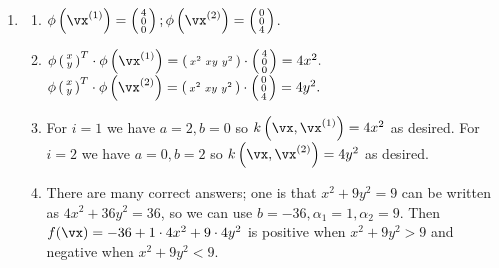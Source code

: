\documentclass{article}
\begin{document}
\begin{enumerate}
\item \label{ML_ex_kerneltrick_solution}
\begin{enumerate}
    \item $\phi\left( \vx^{(1)}\right) = \left( \begin{smallmatrix} 4 \\ 0 \\ 0 \end{smallmatrix} \right);
           \phi\left( \vx^{(2)}\right) = \left( \begin{smallmatrix} 0 \\ 0 \\ 4 \end{smallmatrix} \right)$.
    \item $\phi\left( \begin{smallmatrix} x \\ y         \end{smallmatrix} \right)^T \cdot \phi\left(\vx^{(1)}\right) = 
               \left( \begin{smallmatrix} x^2 & xy & y^2 \end{smallmatrix} \right)   \cdot \left( \begin{smallmatrix} 4 \\ 0 \\ 0 \end{smallmatrix} \right) = 4x^2.$
    \newline
          $\phi\left( \begin{smallmatrix} x \\ y         \end{smallmatrix} \right)^T \cdot \phi\left(\vx^{(2)}\right) = 
               \left( \begin{smallmatrix} x^2 & xy & y^2 \end{smallmatrix}\right)    \cdot \left( \begin{smallmatrix} 0 \\ 0 \\ 4 \end{smallmatrix} \right) = 4y^2.$
    \item For $i=1$ we have $a=2, b=0$ so $k\left(\vx, \vx^{(1)}\right) = 4x^2$ as desired. 
    \newline
    For $i=2$ we have $a=0, b=2$ so $k\left(\vx, \vx^{(2)}\right) = 4y^2$ as desired.
    \item There are many correct answers; one is that $x^2 + 9y^2 = 9$ can be written as $4x^2 + 36y^2 = 36$, so we can use $b = -36, \alpha_1 = 1, \alpha_2 = 9$. Then $f(\vx) = -36 + 1\cdot4x^2 + 9\cdot 4y^2$ is positive when $x^2 + 9y^2 > 9$ and negative when $x^2 + 9y^2 < 9$.
\end{enumerate}


\end{enumerate}
\end{document}
